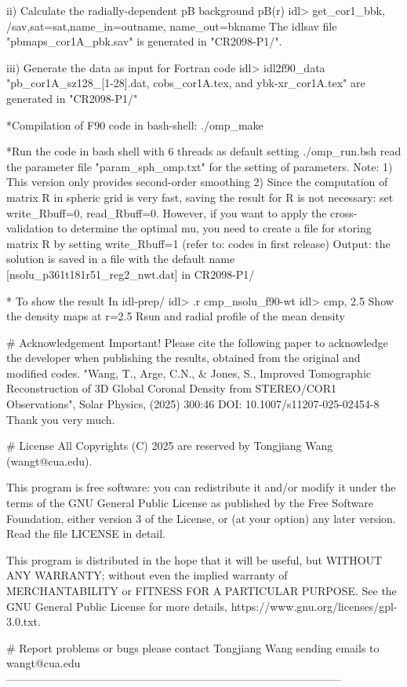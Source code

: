       ii) Calculate the radially-dependent pB background pB(r)
      idl> get_cor1_bbk, /sav,sat=sat,name_in=outname, name_out=bkname
      The idlsav file "pbmaps_cor1A_pbk.sav" is generated in "CR2098-P1/".

      iii) Generate the data as input for Fortran code
      idl> idl2f90_data
      "pb_cor1A_sz128_[1-28].dat, cobs_cor1A.tex, and ybk-xr_cor1A.tex" are generated in "CR2098-P1/"
       
     *Compilation of F90 code in bash-shell:
      ./omp_make
 
     *Run the code in bash shell with 6 threads as default setting
     ./omp_run.bsh
      read the parameter file "param_sph_omp.txt" for the setting of parameters.
     Note:
 	1) This version only provides second-order smoothing 
        2) Since the computation of matrix R in spheric grid is very fast, saving the result
        for R is not necessary: set write_Rbuff=0, read_Rbuff=0. However, if you want to apply
        the cross-validation to determine the optimal mu, you need to create a file for storing
         matrix R by setting write_Rbuff=1 (refer to: codes in first release)
     Output: the solution is saved in a file with the default name [nsolu_p361t181r51_reg2_nwt.dat] in CR2098-P1/

    * To show the result
      In idl-prep/
      idl> .r cmp_nsolu_f90-wt
      idl> cmp, 2.5
      Show the density maps at r=2.5 Rsun and radial profile of the mean density  


   # Acknowledgement
    Important! Please cite the following paper to acknowledge the developer when  
    publishing the results, obtained from the original and modified codes. 
    "Wang, T., Arge, C.N., & Jones, S., Improved Tomographic Reconstruction of 3D Global 
     Coronal Density from STEREO/COR1 Observations", Solar Physics, (2025) 300:46 
     DOI: 10.1007/s11207-025-02454-8
     Thank you very much. 


   # License
    All Copyrights (C) 2025 are reserved by Tongjiang Wang (wangt@cua.edu).

    This program is free software: you can redistribute it and/or modify
    it under the terms of the GNU General Public License as published by
    the Free Software Foundation, either version 3 of the License, or
    (at your option) any later version. Read the file LICENSE in detail. 

    This program is distributed in the hope that it will be useful,
    but WITHOUT ANY WARRANTY; without even the implied warranty of
    MERCHANTABILITY or FITNESS FOR A PARTICULAR PURPOSE.  See the
    GNU General Public License for more details, 
    https://www.gnu.org/licenses/gpl-3.0.txt.

   
   # Report problems or bugs
     please contact Tongjiang Wang sending emails to wangt@cua.edu 
--------------------------------------------------------------------------------------------
